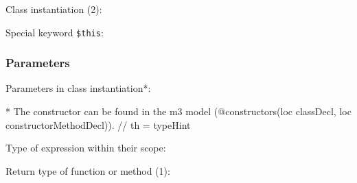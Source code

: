 \documentclass[../main.tex]{subfiles}
\begin{document}
    Class instantiation (2):    
    \begin{prooftree}
    \end{prooftree}
    
    \hrulefill
    
    Special keyword \texttt{\$this}:
    \begin{prooftree}
    \end{prooftree}
    
    \hrulefill
    
    
    
    \subsubsection{Parameters}
    Parameters in class instantiation*:
    \begin{prooftree}
    \end{prooftree}
    * The constructor can be found in the m3 model (@constructors(loc classDecl, loc constructorMethodDecl)).
    // th = typeHint \\
    
    \hrulefill


    Type of expression within their scope:
    \begin{prooftree}
    \end{prooftree}    
    
    \hrulefill
    
    Return type of function or method (1):
    \begin{prooftree}
    \end{prooftree}    
    
    \hrulefill
    
\end{document}
